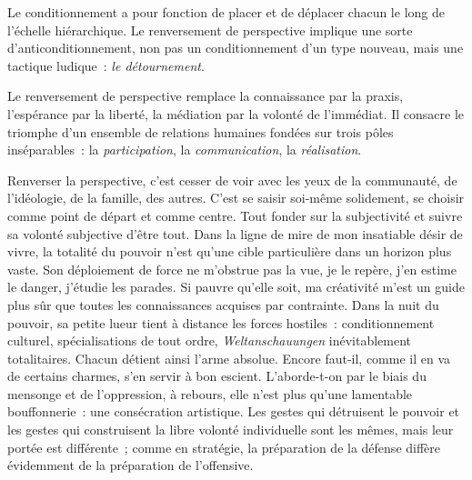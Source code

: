 \documentclass[french,twoside]{book} %
\begin{document}
Le conditionnement a pour fonction de placer et de déplacer chacun le long de l’échelle hiérarchique. Le renversement de perspective implique une sorte d’anticonditionnement, non pas un conditionnement d’un type nouveau, mais une tactique ludique : \emph{le détournement}.\par
Le renversement de perspective remplace la connaissance par la praxis, l’espérance par la liberté, la médiation par la volonté de l’immédiat. Il consacre le triomphe d’un ensemble de relations humaines fondées sur trois pôles inséparables : la \emph{participation}, la \emph{communication}, la \emph{réalisation}.\par
Renverser la perspective, c’est cesser de voir avec les yeux de la communauté, de l’idéologie, de la famille, des autres. C’est se saisir soi-même solidement, se choisir comme point de départ et comme centre. Tout fonder sur la subjectivité et suivre sa volonté subjective d’être tout. Dans la ligne de mire de mon insatiable désir de vivre, la totalité du pouvoir n’est qu’une cible particulière dans un horizon plus vaste. Son déploiement de force ne m’obstrue pas la vue, je le repère, j’en estime le danger, j’étudie les parades. Si pauvre qu’elle soit, ma créativité m’est un guide plus sûr que toutes les connaissances acquises par contrainte. Dans la nuit du pouvoir, sa petite lueur tient à distance les forces hostiles : conditionnement culturel, spécialisations de tout ordre, \emph{Weltanschauungen} inévitablement totalitaires. Chacun détient ainsi l’arme absolue. Encore faut-il, comme il en va de certains charmes, s’en servir à bon escient. L’aborde-t-on par le biais du mensonge et de l’oppression, à rebours, elle n’est plus qu’une lamentable bouffonnerie : une consécration artistique. Les gestes qui détruisent le pouvoir et les gestes qui construisent la libre volonté individuelle sont les mêmes, mais leur portée est différente ; comme en stratégie, la préparation de la défense diffère évidemment de la préparation de l’offensive.\par
\end{document}
